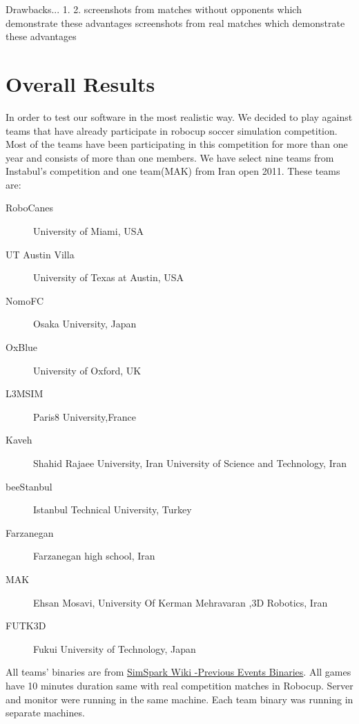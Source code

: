 Drawbacks...
1.
2.
screenshots from matches without opponents which demonstrate these advantages
screenshots from real matches which demonstrate these advantages

\section{Overall Results}
In order to test our software in the most realistic way. We decided to play against teams that have already participate in robocup soccer simulation competition. Most of the teams have been participating in this competition for more than one year and consists of more than one members. We have select nine teams from Instabul's competition and one team(MAK) from Iran open 2011. These teams are:
\begin{description}
\item[RoboCanes]	University of Miami, USA 
\item[UT Austin Villa]	University of Texas at Austin, USA
\item[NomoFC]	Osaka University, Japan
\item[OxBlue]	University of Oxford, UK
\item[L3MSIM]	Paris8 University,France
\item[Kaveh] 	Shahid Rajaee University, Iran University of Science and Technology, Iran
\item[beeStanbul]	Istanbul Technical University, Turkey
\item[Farzanegan]	Farzanegan high school, Iran
\item[MAK]	Ehsan Mosavi, University Of Kerman Mehravaran ,3D Robotics, Iran
\item[FUTK3D]	Fukui University of Technology, Japan
\end{description}
All teams' binaries are from \href{http://simspark.sourceforge.net/binaries/RoboCup2011/}{SimSpark Wiki -Previous Events Binaries}.
All games have 10 minutes duration same with real competition matches in Robocup. Server and monitor were running in the same machine\footnotemark. Each team binary was running in separate machines\footnotemark.
